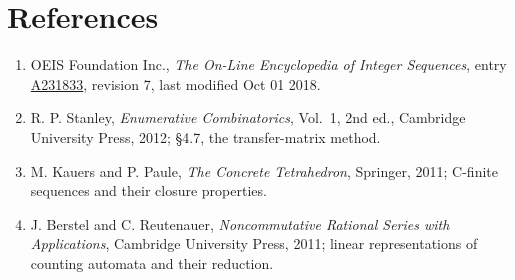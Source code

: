 \documentclass[11pt]{article}
\theoremstyle{definition}
\begin{document}
\section{References}

\begin{enumerate}

\item OEIS Foundation Inc., \emph{The On-Line Encyclopedia of Integer Sequences}, entry \href{https://oeis.org/A231833}{A231833}, revision 7, last modified Oct 01 2018.

\item R. P. Stanley, \emph{Enumerative Combinatorics}, Vol.~1, 2nd ed., Cambridge University Press, 2012; \S4.7, the transfer-matrix method.

\item M. Kauers and P. Paule, \emph{The Concrete Tetrahedron}, Springer, 2011; C-finite sequences and their closure properties.

\item J. Berstel and C. Reutenauer, \emph{Noncommutative Rational Series with Applications}, Cambridge University Press, 2011; linear representations of counting automata and their reduction.

\end{enumerate}
\end{document}

